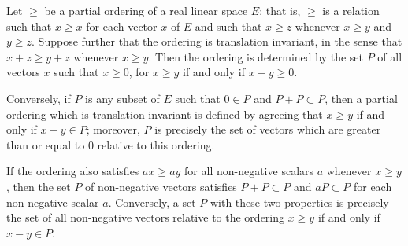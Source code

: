 Let $\geq$ be a partial ordering of a real linear space $E$; that is, $\geq$ is a relation such that $x \geq x$ for each vector $x$ of $E$ and such that $x \geq z$ whenever $x \geq y$ and $y \geq z$. Suppose further that the ordering is translation invariant, in the sense that $x + z \geq y + z$ whenever $x \geq y$. Then the ordering is determined by the set $P$ of all vectors $x$ such that $x \geq 0$, for $x \geq y$ if and only if $x - y \geq 0$.

Conversely, if $P$ is any subset of $E$ such that $0 \in P$ and $P + P \subset P$, then a partial ordering which is translation invariant is defined by agreeing that $x \geq y$ if and only if $x - y \in P$; moreover, $P$ is precisely the set of vectors which are greater than or equal to $0$ relative to this ordering.

If the ordering also satisfies $ax \geq ay$ for all non-negative scalars $a$ whenever $x \geq y$, then the set $P$ of non-negative vectors satisfies $P + P \subset P$ and $aP \subset P$ for each non-negative scalar $a$. Conversely, a set $P$ with these two properties is precisely the set of all non-negative vectors relative to the ordering $x \geq y$ if and only if $x - y \in P$.
